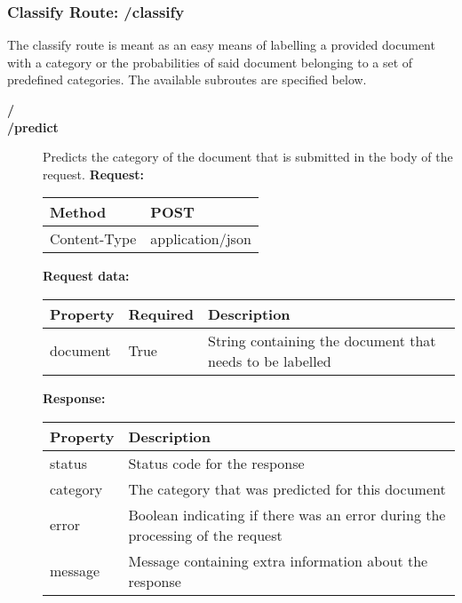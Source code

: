 \subsubsection{Classify Route: /classify}
The classify route is meant as an easy means of labelling a provided document with a category or the probabilities of said document belonging to a set of predefined categories.
The available subroutes are specified below.
\begin{description}
\item[{\large \textbf{/}}]
\item[{\large \textbf{/predict}}]
Predicts the category of the document that is submitted in the body of the request.
\newline
\newline
\textbf{Request:}
\newline
\newline
\begin{tabular}{ | l | l |}
\hline
Method & POST\\ \hline
Content-Type & application/json\\ \hline
\end{tabular}
\newline
\newline
\textbf{Request data:}
\newline
\newline
\begin{tabular}{ | l | l | l |}
\hline
\textbf{Property} & \textbf{Required} & \textbf{Description}\\ \hline
document & True & String containing the document that needs to be labelled\\ \hline
\end{tabular}
\newline
\newline
\textbf{Response:}
\newline
\newline
\begin{tabular}{ | l | l |}
\hline
\textbf{Property} & \textbf{Description}\\ \hline
status & Status code for the response\\ \hline
category & The category that was predicted for this document\\ \hline
error & Boolean indicating if there was an error during the processing of the request\\ \hline
message & Message containing extra information about the response\\ \hline

\end{tabular}
\end{description}
